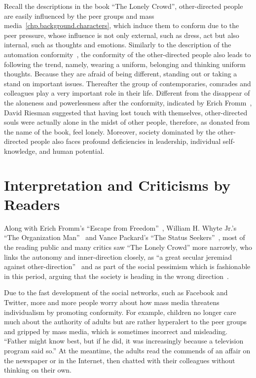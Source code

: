 Recall the descriptions in the book ``The Lonely Crowd'', other-directed people are easily influenced by the peer groups and mass media~\ref{chp.background.characters}, which induce them to conform due to the peer pressure, whose influence is not only external, such as dress, act but also internal, such as thoughts and emotions. Similarly to the description of the automation conformity~\citep{fromm1941fear}, the conformity of the other-directed people also leads to following the trend, namely, wearing a uniform, belonging and thinking uniform thoughts. Because they are afraid of being different, standing out or taking a stand on important issues. Thereafter the group of contemporaries, comrades and colleagues play a very important role in their life. Different from the disappear of the aloneness and powerlessness after the conformity, indicated by Erich Fromm~\citep{fromm1941fear}, David Riesman suggested that having lost touch with themselves, other-directed souls were actually alone in the midst of other people, therefore, as donated from the name of the book, feel lonely. Moreover, society dominated by the other-directed people also faces profound deficiencies in leadership, individual self-knowledge, and human potential. 

\section{Interpretation and Criticisms by Readers}\label{chp.Criticism.Readers}
Along with Erich Fromm’s ``Escape from Freedom''~\citep{fromm1941escape}, William H. Whyte Jr.’s ``The Organization Man''~\citep{whyte2002organization} and Vance Packard’s ``The Status Seekers''~\citep{packard1959status}, most of the reading public and many critics saw ``The Lonely Crowd'' more narrowly, who links the autonomy and inner-direction closely, as ``a great secular jeremiad against other-direction''~\citep{mcclay1998lonely} and as part of the social pessimism which is fashionable in this period, arguing that the society is heading in the wrong direction~\citep{steenvoorden2016societal}. 

Due to the fast development of the social networks, such as Facebook and Twitter, more and more people worry about how mass media threatens individualism by promoting conformity. For example, children no longer care much about the authority of adults but are rather hyperalert to the peer groups and gripped by mass media, which is sometimes incorrect and misleading. ``Father might know best, but if he did, it was increasingly because a television program said so.'' At the meantime, the adults read the commends of an affair on the newspaper or in the Internet, then chatted with their colleagues without thinking on their own. 



